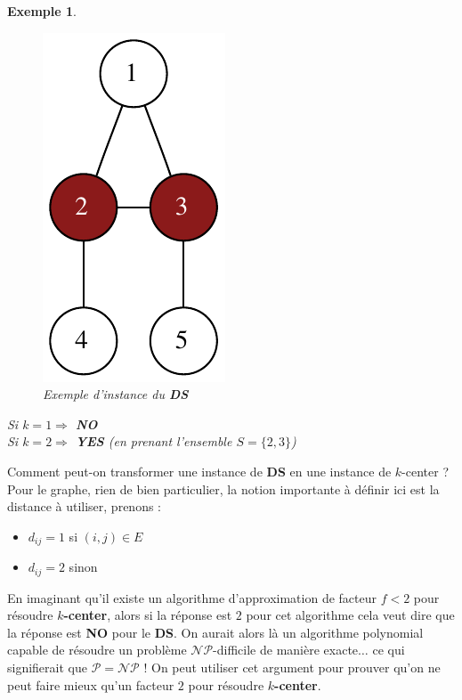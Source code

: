 \documentclass{article}
\newcommand{\titre}[1]{\textcolor{title}{#1}}
\newtheorem{exemple}{Exemple}[section]
\begin{document}
\begin{sffamily}
\newpage

\begin{exemple}$ $\\

\begin{figure}[h!]
    \begin{center}
    \includegraphics[scale=0.5]{inst_ds.pdf}
    \caption{Exemple d'instance du \textbf{\titre{DS}}}
    \end{center}
\end{figure}
\noindent Si $k=1 \Rightarrow$ \textbf{NO} \\
Si $k=2 \Rightarrow$ \textbf{YES} \textit{(en prenant l'ensemble $S=\{2,3\}$)}
\end{exemple}

Comment peut-on transformer une instance de \textbf{\titre{DS}} en une instance de $k$-center ? Pour le graphe, rien de bien particulier,
la notion importante à définir ici est la distance à utiliser, prenons :
\begin{itemize}
\item $d_{ij} = 1$ si $(i,j) \in E$
\item $d_{ij} = 2$ sinon \\
\end{itemize}

En imaginant qu'il existe un algorithme d'approximation de facteur $f < 2$ pour résoudre \textbf{$k$-center}, alors si la réponse est $2$
pour cet algorithme cela veut dire que la réponse est \textbf{NO} pour le \textbf{\titre{DS}}. On aurait alors là un algorithme
polynomial capable de résoudre un problème $\mathcal{NP}$-difficile de manière exacte$\ldots$ ce qui signifierait que $\mathcal{P=NP}$ !
On peut utiliser cet argument pour prouver qu'on ne peut faire mieux qu'un facteur $2$ pour résoudre \textbf{$k$-center}.


\end{sffamily}
\end{document}
